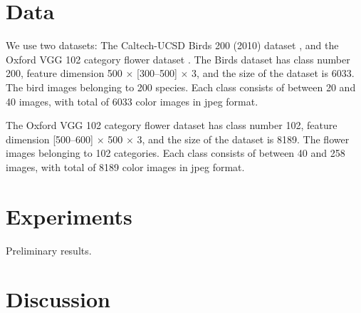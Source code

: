 \documentclass{article}
\newcommand{\bb}[1]{\boldsymbol{#1}}
\begin{document}

\section{Data}

	We use two datasets: The Caltech-UCSD Birds 200 (2010) dataset \cite{Welinder2010}, and the Oxford VGG 102 category flower dataset \cite{Nilsback2008}. The Birds dataset has class number 200, feature dimension 500 $\times$ [300--500] $\times$ 3, and the size of the dataset is 6033. The bird images belonging to 200 species. Each class consists of between 20 and 40 images, with total of 6033 color images in jpeg format.
	
	The Oxford VGG 102 category flower dataset has class number 102, feature dimension [500--600] $\times$ 500 $\times$ 3, and the size of the dataset is 8189. The flower images belonging to 102 categories. Each class consists of between 40 and 258 images, with total of 8189 color images in jpeg format.




\section{Experiments}

	Preliminary results.





\section{Discussion}













\end{document}
